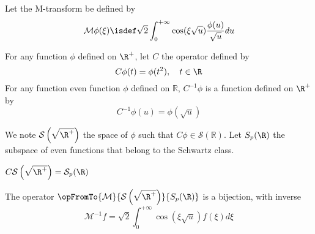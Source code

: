 \documentclass[]{article}
\begin{document}
	
\begin{Def}
	Let the M-transform be defined by
	\[\mathcal{M}\phi(\xi) \isdef \sqrt{2}\int_{0}^{+\infty} \cos(\xi \sqrt{u})\dfrac{\phi(u)}{\sqrt{u}}du\]
\end{Def}
\begin{Def}
	For any function $\phi$ defined on $\R^+$, let $C$ the operator defined by 
	\[C\phi(t) = \phi(t^2), \quad t \in  \R\]
	For any function even function $\phi$ defined on $\mathbb{R}$, $C^{-1}\phi$ is a function defined on $\R^+$ by 
	\[C^{-1}\phi(u) = \phi(\sqrt{u})\] 
\end{Def}
\begin{Def}
	We note $\mathcal{S}\left(\sqrt{\R^+}\right)$ the space of $\phi$ such that $C\phi \in \mathcal{S}(\mathbb{R})$. Let $S_p(\R)$ the subspace of even functions that belong to the Schwartz class. 
\end{Def}
\begin{Prop}
	$C\mathcal{S}\left(\sqrt{\R^+}\right) = \mathcal{S}_p(\R)$
\end{Prop}
\begin{Prop}
	The operator $\opFromTo{\mathcal{M}}{\mathcal{S}\left(\sqrt{\R^+}\right)}{S_p(\R)}$ is a bijection, with inverse 
	\[\mathcal{M}^{-1}f = \sqrt{2}\int_{0}^{+\infty}\cos(\xi\sqrt{u})f(\xi) d\xi\]
\end{Prop}
\end{document}
